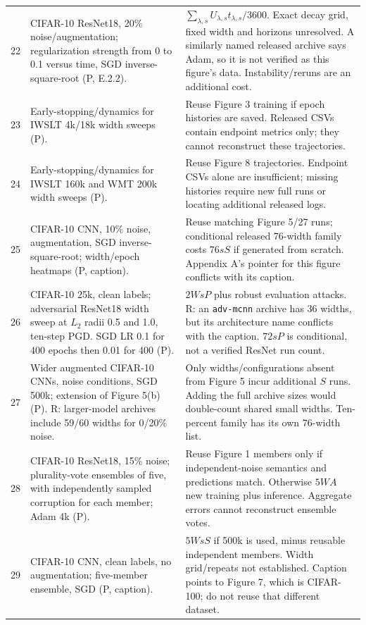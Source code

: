 \documentclass{article}
\begin{document}
\begin{longtable}{@{}P{0.32in}P{3.47in}P{2.9in}@{}}
22 & CIFAR-10 ResNet18, 20\% noise/augmentation; regularization strength from 0 to 0.1 versus time, SGD inverse-square-root (P, E.2.2). & $\sum_{\lambda,s}U_{\lambda,s}t_{\lambda,s}/3600$. Exact decay grid, fixed width and horizons unresolved. A similarly named released archive says Adam, so it is not verified as this figure's data. Instability/reruns are an additional cost.\\
23 & Early-stopping/dynamics for IWSLT 4k/18k width sweeps (P). & Reuse Figure 3 training if epoch histories are saved. Released CSVs contain endpoint metrics only; they cannot reconstruct these trajectories.\\
24 & Early-stopping/dynamics for IWSLT 160k and WMT 200k width sweeps (P). & Reuse Figure 8 trajectories. Endpoint CSVs alone are insufficient; missing histories require new full runs or locating additional released logs.\\
25 & CIFAR-10 CNN, 10\% noise, augmentation, SGD inverse-square-root; width/epoch heatmaps (P, caption). & Reuse matching Figure 5/27 runs; conditional released 76-width family costs $76sS$ if generated from scratch. Appendix A's pointer for this figure conflicts with its caption.\\
26 & CIFAR-10 25k, clean labels; adversarial ResNet18 width sweep at $L_2$ radii 0.5 and 1.0, ten-step PGD. SGD LR 0.1 for 400 epochs then 0.01 for 400 (P). & $2WsP$ plus robust evaluation attacks. R: an \texttt{adv-mcnn} archive has 36 widths, but its architecture name conflicts with the caption. $72sP$ is conditional, not a verified ResNet run count.\\
27 & Wider augmented CIFAR-10 CNNs, noise conditions, SGD 500k; extension of Figure 5(b) (P). R: larger-model archives include 59/60 widths for 0/20\% noise. & Only widths/configurations absent from Figure 5 incur additional $S$ runs. Adding the full archive sizes would double-count shared small widths. Ten-percent family has its own 76-width list.\\
28 & CIFAR-10 ResNet18, 15\% noise; plurality-vote ensembles of five, with independently sampled corruption for each member; Adam 4k (P). & Reuse Figure 1 members only if independent-noise semantics and predictions match. Otherwise $5WA$ new training plus inference. Aggregate errors cannot reconstruct ensemble votes.\\
29 & CIFAR-10 CNN, clean labels, no augmentation; five-member ensemble, SGD (P, caption). & $5WsS$ if 500k is used, minus reusable independent members. Width grid/repeats not established. Caption points to Figure 7, which is CIFAR-100; do not reuse that different dataset.\\
\bottomrule
\end{longtable}
\endgroup
\end{document}
